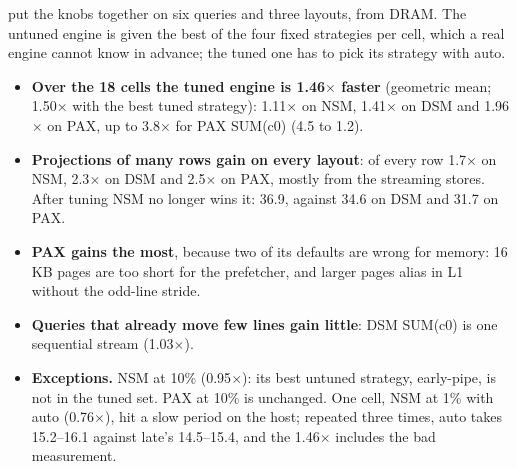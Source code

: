 put the knobs together on six queries and three layouts, from DRAM.
The untuned engine is given the best of the four fixed strategies per cell, which a real engine
cannot know in advance; the tuned one has to pick its strategy with auto.
\begin{itemize}
\item \textbf{Over the 18 cells the tuned engine is 1.46$\times$ faster} (geometric mean;
1.50$\times$ with the best tuned strategy): 1.11$\times$ on NSM, 1.41$\times$ on DSM and
1.96$\times$ on PAX, up to 3.8$\times$ for PAX SUM(c0) (4.5 to 1.2\ms).
\item \textbf{Projections of many rows gain on every layout}:  of every row
1.7$\times$ on NSM, 2.3$\times$ on DSM and 2.5$\times$ on PAX, mostly from the streaming stores.
After tuning NSM no longer wins it: 36.9\ms, against 34.6 on DSM and 31.7 on PAX.
\item \textbf{PAX gains the most}, because two of its defaults are wrong for memory: 16\,KB pages
are too short for the prefetcher, and larger pages alias in L1 without the odd-line stride.
\item \textbf{Queries that already move few lines gain little}: DSM SUM(c0) is one sequential
stream (1.03$\times$).
\item \textbf{Exceptions.} NSM  at 10\% (0.95$\times$): its best untuned
strategy, early-pipe, is not in the tuned set. PAX at 10\% is unchanged. One cell, NSM
 at 1\% with auto (0.76$\times$), hit a slow period on the host; repeated
three times, auto takes 15.2--16.1\ms{} against late's 14.5--15.4, and the 1.46$\times$ includes
the bad measurement.
\end{itemize}
